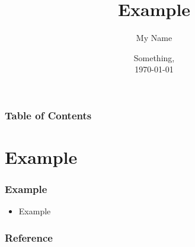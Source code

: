 \documentclass[10pt]{../../Formats/RU}
\title[Example]{Example}
\author[Initial] %
{My Name\inst{1}
}
\institute[University] %
{
    \inst{1}%
    Some University
}
\date[\today] %
{
Something, \\
\today}
\begin{document}
\frame{\titlepage}
\begin{frame}
\frametitle{Table of Contents}
\tableofcontents
\end{frame}
\section{Example}
\begin{frame}
    \frametitle{Example}
    \begin{itemize}
        \item Example
    \end{itemize}
\end{frame}

\begin{frame}[allowframebreaks]
    \frametitle{Reference}
    \printbibliography
\end{frame}
\end{document}
